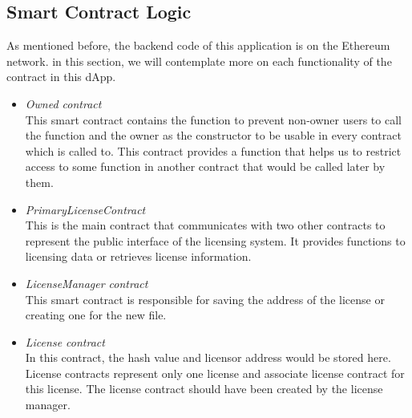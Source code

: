 \subsection{Smart Contract Logic}
As mentioned before, the backend code of this application is on the Ethereum network. in this section, we will contemplate more on each functionality of the contract in this dApp.
\begin{itemize}
	\item \textit{Owned contract} \\
	This smart contract contains the function to prevent non-owner users to call the function and the owner as the constructor to be usable in every contract which is called to. This contract provides a function that helps us to restrict access to some function in another contract that would be called later by them. \\
	\item \textit{PrimaryLicenseContract} \\
	This is the main contract that communicates with two other contracts to represent the public interface of the licensing system. It provides functions to licensing data or retrieves license information. \\
   \item \textit{LicenseManager contract} \\
	This smart contract is responsible for saving the address of the license or creating one for the new file. \\
	\item \textit{License contract} \\
	In this contract, the hash value and licensor address would be stored here. License contracts represent only one license and associate license contract for this license. The license contract should have been created by the license manager.

\end{itemize}

